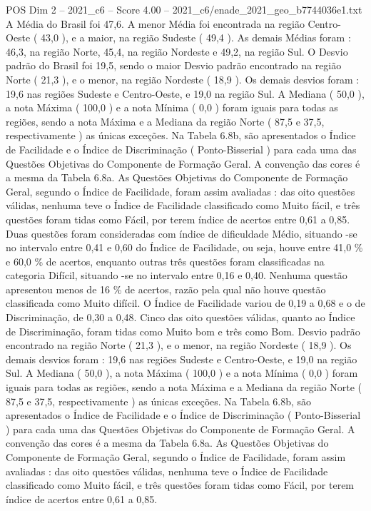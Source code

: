\begin{textsample}{POS Dim 2 – 2021\_c6 – Score 4.00 – 2021\_c6/enade\_2021\_geo\_b7744036e1.txt}
A Média do Brasil foi 47,6.
A menor Média foi encontrada na região Centro-Oeste ( 43,0 ), e a maior, na região Sudeste ( 49,4 ).
As demais Médias foram : 46,3, na região Norte, 45,4, na região Nordeste e 49,2, na região Sul.
O Desvio padrão do Brasil foi 19,5, sendo o maior Desvio padrão encontrado na região Norte ( 21,3 ), e o menor, na região Nordeste ( 18,9 ).
Os demais desvios foram : 19,6 nas regiões Sudeste e Centro-Oeste, e 19,0 na região Sul.
A Mediana ( 50,0 ), a nota Máxima ( 100,0 ) e a nota Mínima ( 0,0 ) foram iguais para todas as regiões, sendo a nota Máxima e a Mediana da região Norte ( 87,5 e 37,5, respectivamente ) as únicas exceções.
Na Tabela 6.8b, são apresentados o Índice de Facilidade e o Índice de Discriminação ( Ponto-Bisserial ) para cada uma das Questões Objetivas do Componente de Formação Geral.
A convenção das cores é a mesma da Tabela 6.8a.
As Questões Objetivas do Componente de Formação Geral, segundo o Índice de Facilidade, foram assim avaliadas : das oito questões válidas, nenhuma teve o Índice de Facilidade classificado como Muito fácil, e três questões foram tidas como Fácil, por terem índice de acertos entre 0,61 a 0,85.
Duas questões foram consideradas com índice de dificuldade Médio, situando -se no intervalo entre 0,41 e 0,60 do Índice de Facilidade, ou seja, houve entre 41,0 \% e 60,0 \% de acertos, enquanto outras três questões foram classificadas na categoria Difícil, situando -se no intervalo entre 0,16 e 0,40.
Nenhuma questão apresentou menos de 16 \% de acertos, razão pela qual não houve questão classificada como Muito difícil.
O Índice de Facilidade variou de 0,19 a 0,68 e o de Discriminação, de 0,30 a 0,48.
Cinco das oito questões válidas, quanto ao Índice de Discriminação, foram tidas como Muito bom e três como Bom.
Desvio padrão encontrado na região Norte ( 21,3 ), e o menor, na região Nordeste ( 18,9 ).
Os demais desvios foram : 19,6 nas regiões Sudeste e Centro-Oeste, e 19,0 na região Sul.
A Mediana ( 50,0 ), a nota Máxima ( 100,0 ) e a nota Mínima ( 0,0 ) foram iguais para todas as regiões, sendo a nota Máxima e a Mediana da região Norte ( 87,5 e 37,5, respectivamente ) as únicas exceções.
Na Tabela 6.8b, são apresentados o Índice de Facilidade e o Índice de Discriminação ( Ponto-Bisserial ) para cada uma das Questões Objetivas do Componente de Formação Geral.
A convenção das cores é a mesma da Tabela 6.8a.
As Questões Objetivas do Componente de Formação Geral, segundo o Índice de Facilidade, foram assim avaliadas : das oito questões válidas, nenhuma teve o Índice de Facilidade classificado como Muito fácil, e três questões foram tidas como Fácil, por terem índice de acertos entre 0,61 a 0,85.

\end{textsample}
